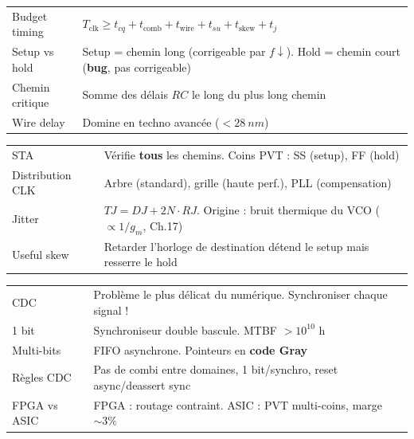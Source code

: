 \documentclass[12pt,a4paper,twoside]{book}
\begin{document}
\begin{bases}[title={\color{white} Résumé --- Les Bases}]
\begin{center}
\renewcommand{\arraystretch}{1.3}
\begin{tabular}{p{3.5cm}p{9.5cm}}
\toprule
Budget timing & $T_{\text{clk}} \geq t_{cq} + t_{\text{comb}} + t_{\text{wire}} + t_{su} + t_{\text{skew}} + t_j$ \\
Setup vs hold & Setup = chemin long (corrigeable par $f\downarrow$). Hold = chemin court (\textbf{bug}, pas corrigeable) \\
Chemin critique & Somme des délais $RC$ le long du plus long chemin \\
Wire delay & Domine en techno avancée ($< \SI{28}{nm}$) \\
\bottomrule
\end{tabular}
\end{center}
\end{bases}

\begin{approfondissement}[title={\color{white} Résumé --- Approfondissement}]
\begin{center}
\renewcommand{\arraystretch}{1.3}
\begin{tabular}{p{3.5cm}p{9.5cm}}
\toprule
STA & Vérifie \textbf{tous} les chemins. Coins PVT : SS (setup), FF (hold) \\
Distribution CLK & Arbre (standard), grille (haute perf.), PLL (compensation) \\
Jitter & $TJ = DJ + 2N\cdot RJ$. Origine : bruit thermique du VCO ($\propto 1/g_m$, Ch.17) \\
Useful skew & Retarder l'horloge de destination détend le setup mais resserre le hold \\
\bottomrule
\end{tabular}
\end{center}
\end{approfondissement}

\begin{ingenieur}[title={\color{white} Résumé --- Niveau Ingénieur}]
\begin{center}
\renewcommand{\arraystretch}{1.3}
\begin{tabular}{p{3.5cm}p{9.5cm}}
\toprule
CDC & Problème le plus délicat du numérique. Synchroniser chaque signal ! \\
1 bit & Synchroniseur double bascule. MTBF $> 10^{10}$ h \\
Multi-bits & FIFO asynchrone. Pointeurs en \textbf{code Gray} \\
Règles CDC & Pas de combi entre domaines, 1 bit/synchro, reset async/deassert sync \\
FPGA vs ASIC & FPGA : routage contraint. ASIC : PVT multi-coins, marge $\sim 3\%$ \\
\bottomrule
\end{tabular}
\end{center}
\end{ingenieur}
\end{document}
